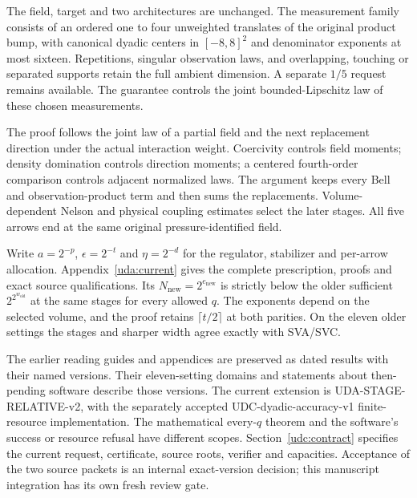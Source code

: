 \documentclass[11pt]{article}
\theoremstyle{plain}
\theoremstyle{definition}
\theoremstyle{remark}
\begin{document}
The field, target and two architectures are unchanged. The measurement
family consists of an ordered one to four unweighted translates of the
original product bump, with canonical dyadic centers in $[-8,8]^2$ and
denominator exponents at most sixteen. Repetitions, singular observation
laws, and overlapping, touching or separated supports retain the full
ambient dimension. A separate $1/5$ request remains available. The guarantee
controls the joint bounded-Lipschitz law of these chosen measurements.

The proof follows the joint law of a partial field and the next replacement
direction under the actual interaction weight. Coercivity controls field
moments; density domination controls direction moments; a centered fourth-order
comparison controls adjacent normalized laws. The argument keeps every Bell
and observation-product term and then sums the replacements. Volume-dependent
Nelson and physical coupling estimates select the later stages. All five
arrows end at the same original pressure-identified field.

Write $a=2^{-p}$, $\epsilon=2^{-t}$ and $\eta=2^{-d}$ for the regulator,
stabilizer and per-arrow allocation. Appendix~\ref{uda:current} gives
the complete prescription, proofs and exact source qualifications. Its
$N_{\mathrm{new}}=2^{e_{\mathrm{new}}}$ is strictly below the older sufficient
$2^{2^{w_{\mathrm{old}}}}$ at the same stages for every allowed $q$.
The exponents depend on the selected volume, and the proof retains
$\lceil t/2\rceil$ at both parities. On the eleven older settings the
stages and sharper width agree exactly with SVA/SVC.

The earlier reading guides and appendices are preserved as dated results
with their named versions. Their eleven-setting domains and statements
about then-pending software describe those versions. The current extension
is UDA-STAGE-RELATIVE-v2, with the separately accepted
UDC-dyadic-accuracy-v1 finite-resource implementation. The mathematical
every-$q$ theorem and the software's success or resource refusal have
different scopes. Section~\ref{udc:contract} specifies the current request,
certificate, source roots, verifier and capacities. Acceptance of the two
source packets is an internal exact-version decision; this manuscript
integration has its own fresh review gate.
\end{document}
